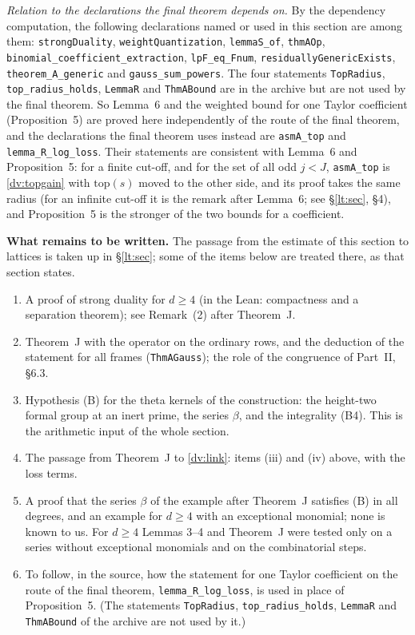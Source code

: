 \documentclass[11pt,letterpaper]{article}
\begin{document}
\emph{Relation to the declarations the final theorem depends on.} By the dependency computation, the
following declarations named or used in this section are among them: \texttt{strongDuality},
\texttt{weightQuantization}, \texttt{lemmaS\_of}, \texttt{thmAOp},
\texttt{binomial\_coefficient\_extraction}, \texttt{lpF\_eq\_Fnum}, \texttt{residuallyGenericExists},
\texttt{theorem\_A\_generic} and \texttt{gauss\_sum\_powers}. The four statements \texttt{TopRadius},
\texttt{top\_radius\_holds}, \texttt{LemmaR} and \texttt{ThmABound} are in the archive but are not used by
the final theorem. So Lemma~6 and the weighted bound for one Taylor coefficient (Proposition~5) are proved
here independently of the route of the final theorem, and the declarations the final theorem uses instead are \texttt{asmA\_top} and \texttt{lemma\_R\_log\_loss}. Their statements are consistent with Lemma~6 and Proposition~5: for a finite cut-off, and for the set of all odd $j<J$, \texttt{asmA\_top} is \eqref{dv:topgain} with $\mathrm{top}(s)$ moved to the other side, and its proof takes the same radius (for an infinite cut-off it is the remark after Lemma~6; see \S\ref{lt:sec}, \S4), and Proposition~5 is the stronger of the two bounds for a coefficient.

\textbf{What remains to be written.} The passage from the estimate of this section to lattices is taken up in \S\ref{lt:sec}; some of the items below are treated there, as that section states.
\begin{enumerate}[label=\textup{(\roman*)},leftmargin=2.4em]
\item A proof of strong duality for $d\ge4$ (in the Lean: compactness and a separation theorem); see
Remark~(2) after Theorem~J.
\item Theorem~J with the operator on the ordinary rows, and the deduction of the statement for all frames
(\texttt{ThmAGauss}); the role of the congruence of Part~II, \S6.3.
\item Hypothesis (B) for the theta kernels of the construction: the height-two formal group at an inert
prime, the series $\beta$, and the integrality (B4). This is the arithmetic input of the whole section.
\item The passage from Theorem~J to \eqref{dv:link}: items (iii) and (iv) above, with the loss terms.
\item A proof that the series $\beta$ of the example after Theorem~J satisfies (B) in all degrees, and an
example for $d\ge4$ with an exceptional monomial; none is known to us. For $d\ge4$ Lemmas 3--4 and
Theorem~J were tested only on a series without exceptional monomials and on the combinatorial steps.
\item To follow, in the source, how the statement for one Taylor coefficient on the route of the final
theorem, \texttt{lemma\_R\_log\_loss}, is used in place of Proposition~5. (The statements
\texttt{TopRadius}, \texttt{top\_radius\_holds}, \texttt{LemmaR} and \texttt{ThmABound} of the archive are
not used by it.)
\end{enumerate}
\end{document}
